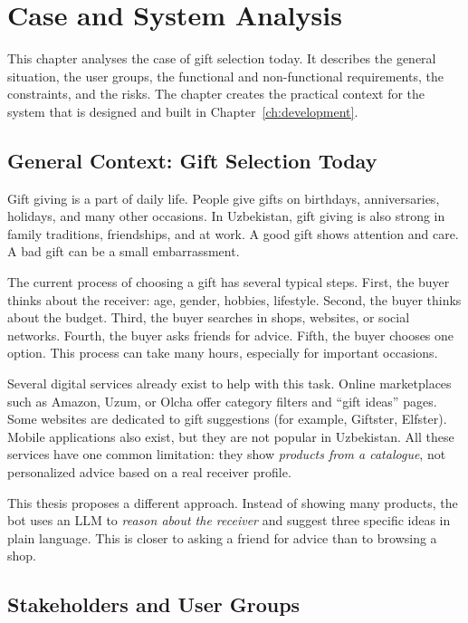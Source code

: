 \chapter{Case and System Analysis}
\label{ch:analysis}

This chapter analyses the case of gift selection today. It describes the general situation, the user groups, the functional and non-functional requirements, the constraints, and the risks. The chapter creates the practical context for the system that is designed and built in Chapter~\ref{ch:development}.

\section{General Context: Gift Selection Today}
\label{sec:context}

Gift giving is a part of daily life. People give gifts on birthdays, anniversaries, holidays, and many other occasions. In Uzbekistan, gift giving is also strong in family traditions, friendships, and at work. A good gift shows attention and care. A bad gift can be a small embarrassment.

The current process of choosing a gift has several typical steps. First, the buyer thinks about the receiver: age, gender, hobbies, lifestyle. Second, the buyer thinks about the budget. Third, the buyer searches in shops, websites, or social networks. Fourth, the buyer asks friends for advice. Fifth, the buyer chooses one option. This process can take many hours, especially for important occasions.

Several digital services already exist to help with this task. Online marketplaces such as Amazon, Uzum, or Olcha offer category filters and ``gift ideas'' pages. Some websites are dedicated to gift suggestions (for example, Giftster, Elfster). Mobile applications also exist, but they are not popular in Uzbekistan. All these services have one common limitation: they show \textit{products from a catalogue}, not personalized advice based on a real receiver profile.

This thesis proposes a different approach. Instead of showing many products, the bot uses an LLM to \textit{reason about the receiver} and suggest three specific ideas in plain language. This is closer to asking a friend for advice than to browsing a shop.

\section{Stakeholders and User Groups}
\label{sec:users}

